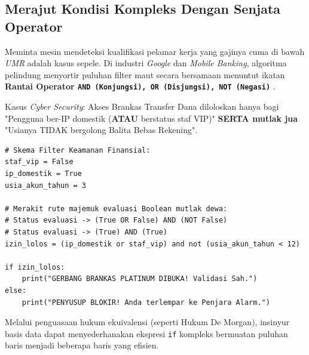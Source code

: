 \subsection{Merajut Kondisi Kompleks Dengan Senjata Operator}

Meminta mesin mendeteksi kualifikasi pelamar kerja yang gajinya cuma di bawah \textit{UMR} adalah kasus sepele. Di industri \textit{Google} dan \textit{Mobile Banking}, algoritma pelindung menyortir puluhan filter maut secara bersamaan menuntut ikatan \textbf{Rantai Operator \texttt{AND (Konjungsi), OR (Disjungsi), NOT (Negasi)}} \cite{python_docs_boolean}.

\begin{contoh}
Kasus \textit{Cyber Security}: Akses Brankas Transfer Dana diloloskan hanya bagi "Pengguna ber-IP domestik (\textbf{ATAU} berstatus staf VIP)" \textbf{SERTA mutlak jua} "Usianya TIDAK bergolong Balita Bebas Rekening".

\begin{lstlisting}[style=pythonstyle, caption={Operasi Filter Keamanan dengan Operator Boolean}]
# Skema Filter Keamanan Finansial:
staf_vip = False
ip_domestik = True
usia_akun_tahun = 3

# Merakit rute majemuk evaluasi Boolean mutlak dewa:
# Status evaluasi -> (True OR False) AND (NOT False)
# Status evaluasi -> (True) AND (True)
izin_lolos = (ip_domestik or staf_vip) and not (usia_akun_tahun < 12)

if izin_lolos:
    print("GERBANG BRANKAS PLATINUM DIBUKA! Validasi Sah.")
else:
    print("PENYUSUP BLOKIR! Anda terlempar ke Penjara Alarm.")
\end{lstlisting}
Melalui penguasaan hukum ekuivalensi (seperti Hukum De Morgan), insinyur basis data dapat menyederhanakan ekspresi \texttt{if} kompleks bermuatan puluhan baris menjadi beberapa baris yang efisien.
\end{contoh}
